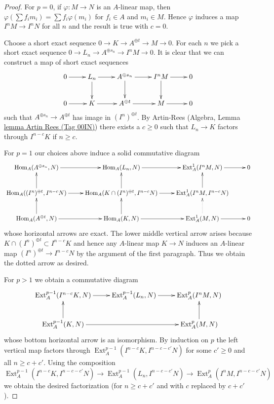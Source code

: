 \documentclass{amsart}
\theoremstyle{plain}
\theoremstyle{definition}
\theoremstyle{remark}
\numberwithin{equation}{subsection}
\def\Hom{\mathop{\mathrm{Hom}}\nolimits}
\def\Ext{\mathop{\mathrm{Ext}}\nolimits}
\begin{document}
\begin{proof}
For $p = 0$, if $\varphi : M \to N$ is an $A$-linear map, then
$\varphi(\sum f_i m_i) = \sum f_i \varphi(m_i)$ for $f_i \in A$
and $m_i \in M$. Hence $\varphi$ induces a map $I^nM \to I^nN$
for all $n$ and the result is true with $c = 0$.

\medskip\noindent
Choose a short exact sequence $0 \to K \to A^{\oplus t} \to M \to 0$.
For each $n$ we pick a short exact sequence
$0 \to L_n \to A^{\oplus s_n} \to I^nM \to 0$.
It is clear that we can construct a map of short exact sequences
$$
\xymatrix{
0 \ar[r] &
L_n \ar[r] \ar[d] &
A^{\oplus s_n} \ar[r] \ar[d] &
I^nM \ar[r] \ar[d] & 0 \\
0 \ar[r] &
K \ar[r] &
A^{\oplus t} \ar[r] &
M \ar[r] & 0
}
$$
such that $A^{\oplus s_n} \to A^{\oplus t}$ has image in $(I^n)^{\oplus t}$.
By Artin-Rees (Algebra, Lemma \href{https://stacks.math.columbia.edu/tag/00IN}{lemma Artin Rees (Tag 00IN)}) there exists
a $c \geq 0$ such that $L_n \to K$ factors through $I^{n - c}K$ if $n \geq c$.

\medskip\noindent
For $p = 1$ our choices above induce a solid commutative diagram
$$
\xymatrix{
\Hom_A(A^{\oplus s_n}, N) \ar[r] &
\Hom_A(L_n, N) \ar[r] &
\Ext_A^1(I^nM, N) \ar[r] & 0 \\
\Hom_A((I^n)^{\oplus t}, I^{n - c}N) \ar[r] \ar[u] &
\Hom_A(K \cap (I^n)^{\oplus t}, I^{n - c}N) \ar[r] \ar[u] &
\Ext_A^1(I^nM, I^{n - c}N) \ar[u] \\
\Hom_A(A^{\oplus t}, N) \ar[r] \ar[u] &
\Hom_A(K, N) \ar[r] \ar[u] &
\Ext_A^1(M, N) \ar@{..>}[u] \ar[r] & 0
}
$$
whose horizontal arrows are exact. The lower middle vertical arrow
arises because $K \cap (I^n)^{\oplus t} \subset I^{n - c}K$
and hence any $A$-linear map $K \to N$ induces an $A$-linear map
$(I^n)^{\oplus t} \to I^{n - c}N$ by the argument of the first paragraph.
Thus we obtain the dotted arrow as desired.

\medskip\noindent
For $p > 1$ we obtain a commutative diagram
$$
\xymatrix{
\Ext^{p - 1}_A(I^{n - c}K, N) \ar[r] &
\Ext^{p - 1}_A(L_n, N) \ar[r] &
\Ext_A^p(I^nM, N) \\
\Ext^{p - 1}_A(K, N) \ar[rr] \ar[u] & &
\Ext_A^p(M, N) \ar[u]
}
$$
whose bottom horizontal arrow is an isomorphism. By induction
on $p$ the left vertical map factors through
$\Ext^{p - 1}_A(I^{n - c}K, I^{n - c - c'}N)$ for some $c' \geq 0$
and all $n \geq c + c'$. Using the composition
$\Ext^{p - 1}_A(I^{n - c}K, I^{n - c - c'}N) \to
\Ext^{p - 1}_A(L_n, I^{n - c - c'}N) \to \Ext^p_A(I^nM, I^{n - c - c'}N)$
we obtain the desired factorization (for $n \geq c + c'$ and with $c$
replaced by $c + c'$).
\end{proof}
\end{document}
